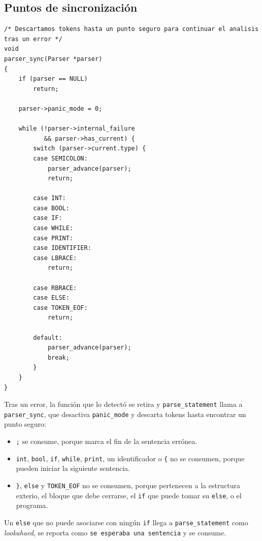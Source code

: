 \documentclass[12pt,letterpaper]{article}
\begin{document}
\subsection*{Puntos de sincronización}

\begin{lstlisting}[style=modernc, caption={Función \texttt{parser\_sync}.}]
/* Descartamos tokens hasta un punto seguro para continuar el analisis tras un error */
void
parser_sync(Parser *parser)
{
    if (parser == NULL)
        return;

    parser->panic_mode = 0;

    while (!parser->internal_failure
           && parser->has_current) {
        switch (parser->current.type) {
        case SEMICOLON:
            parser_advance(parser);
            return;

        case INT:
        case BOOL:
        case IF:
        case WHILE:
        case PRINT:
        case IDENTIFIER:
        case LBRACE:
            return;

        case RBRACE:
        case ELSE:
        case TOKEN_EOF:
            return;

        default:
            parser_advance(parser);
            break;
        }
    }
}
\end{lstlisting}

\bigskip

Tras un error, la función que lo detectó se retira y \texttt{parse\_statement} llama a \texttt{parser\_sync},
que desactiva \texttt{panic\_mode} y descarta tokens hasta encontrar un punto seguro:

\begin{itemize}
\item \texttt{;} se consume, porque marca el fin de la sentencia errónea.
\item \texttt{int}, \texttt{bool}, \texttt{if}, \texttt{while}, \texttt{print}, un identificador o
  \texttt{\{} no se consumen, porque pueden iniciar la siguiente sentencia.
\item \texttt{\}}, \texttt{else} y \texttt{TOKEN\_EOF} no se consumen, porque pertenecen a la estructura
  exterio, el bloque que debe cerrarse, el \texttt{if} que puede tomar su \texttt{else}, o el programa.
\end{itemize}

Un \texttt{else} que no puede asociarse con ningún \texttt{if} llega a \texttt{parse\_statement} como
\emph{lookahaed}, se reporta como \texttt{se esperaba una sentencia} y se consume.\\
\end{document}
